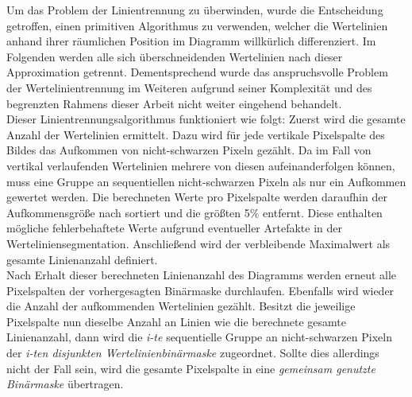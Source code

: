 Um das Problem der Linientrennung zu überwinden, wurde die Entscheidung getroffen, einen primitiven Algorithmus zu verwenden, welcher die Wertelinien anhand ihrer räumlichen Position im Diagramm willkürlich differenziert. Im Folgenden werden alle sich überschneidenden Wertelinien nach dieser Approximation getrennt. Dementsprechend wurde das anspruchsvolle Problem der Wertelinientrennung im Weiteren aufgrund seiner Komplexität und des begrenzten Rahmens dieser Arbeit nicht weiter eingehend behandelt.
\\
Dieser Linientrennungsalgorithmus funktioniert wie folgt: Zuerst wird die gesamte Anzahl der Wertelinien ermittelt. Dazu wird für jede vertikale Pixelspalte des Bildes das Aufkommen von nicht-schwarzen Pixeln gezählt. Da im Fall von vertikal verlaufenden Wertelinien mehrere von diesen aufeinanderfolgen können, muss eine Gruppe an sequentiellen nicht-schwarzen Pixeln als nur ein Aufkommen gewertet werden. Die berechneten Werte pro Pixelspalte werden daraufhin der Aufkommensgröße nach sortiert und die größten 5\% entfernt. Diese enthalten mögliche fehlerbehaftete Werte aufgrund eventueller Artefakte in der Werteliniensegmentation. Anschließend wird der verbleibende Maximalwert als gesamte Linienanzahl definiert.
\\
Nach Erhalt dieser berechneten Linienanzahl des Diagramms werden erneut alle Pixelspalten der vorhergesagten Binärmaske durchlaufen. Ebenfalls wird wieder die Anzahl der aufkommenden Wertelinien gezählt. Besitzt die jeweilige Pixelspalte nun dieselbe Anzahl an Linien wie die berechnete gesamte Linienanzahl, dann wird die \emph{i-te} sequentielle Gruppe an nicht-schwarzen Pixeln der \emph{i-ten disjunkten Wertelinienbinärmaske} zugeordnet. Sollte dies allerdings nicht der Fall sein, wird die gesamte Pixelspalte in eine \emph{gemeinsam genutzte Binärmaske} übertragen.

